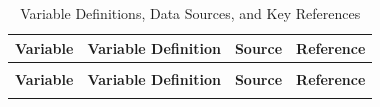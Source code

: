 \documentclass[12pt]{article}
\begin{document}
\vspace{0.3cm}
\begingroup
\footnotesize %
\setlength{\tabcolsep}{4pt}
\renewcommand{\arraystretch}{1.08}
\begin{xltabular}{\textwidth}{@{} >{\RaggedRight\arraybackslash}p{3.1cm} >{\RaggedRight\arraybackslash}X >{\RaggedRight\arraybackslash}p{2.6cm} >{\RaggedRight\arraybackslash}p{2.8cm} @{}}
  \caption{Variable Definitions, Data Sources, and Key References} \\
  \toprule
  \textbf{Variable} & \textbf{Variable Definition} & \textbf{Source} & \textbf{Reference} \\
  \midrule
  \endfirsthead

   \\
  \toprule
  \textbf{Variable} & \textbf{Variable Definition} & \textbf{Source} & \textbf{Reference} \\
  \midrule
  \endhead

  \bottomrule
  \endfoot

  \addlinespace[2pt]
  
  \bottomrule
  \endlastfoot

   \\
  \midrule


\end{xltabular}
\end{document}
